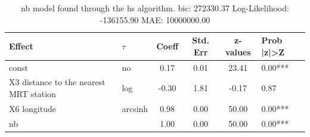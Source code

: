 \begin{table}
	\caption{nb model found through the hs algorithm. bic: 272330.37 Log-Likelihood: -136155.90 MAE: 10000000.00}
	\begin{center}
		\begin{tabular}{|l|l|c|c|c|l|}
			\hline
			Effect & $\tau$ & Coeff & Std. Err & z-values & Prob |z|>Z \\
			\hline
			const & no & 0.17 & 0.01 & 23.41 & 0.00*** \\
			\hline
			X3 distance to the nearest MRT station & log & -0.30 & 1.81 & -0.17 & 0.87 \\
			\hline
			X6 longitude & arcsinh & 0.98 & 0.00 & 50.00 & 0.00*** \\
			\hline
			nb &  & 1.00 & 0.00 & 50.00 & 0.00*** \\
			\hline
		\end{tabular}
	\end{center}
\end{table}